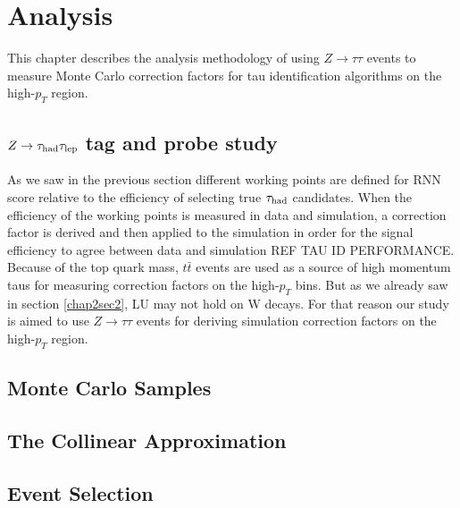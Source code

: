 \chapter{Analysis}\label{chap1}
This chapter describes the analysis methodology of using $Z\to\tau\tau$ events to measure Monte Carlo correction factors for tau identification algorithms on the high-$p_T$ region.


\section{$Z\to\tau_\text{had}\tau_\text{lep}$ tag and probe study}
As we saw in the previous section different working points are defined for RNN score relative to the efficiency of selecting true $\tau_\text{had}$ candidates. When the efficiency of the working points is measured in data and simulation, a correction factor is derived and then applied to the simulation in order for the signal efficiency to agree between data and simulation REF TAU ID PERFORMANCE. Because of the top quark mass, $t\bar{t}$ events are used as a source of high momentum taus for measuring correction factors on the high-$p_T$ bins. But as we already saw in section \ref{chap2sec2}, LU may not hold on W decays. For that reason our study is aimed to use $Z\to\tau\tau$ events for deriving simulation correction factors on the high-$p_T$ region.   

\section{Monte Carlo Samples}

\section{The Collinear Approximation}

\section{Event Selection}